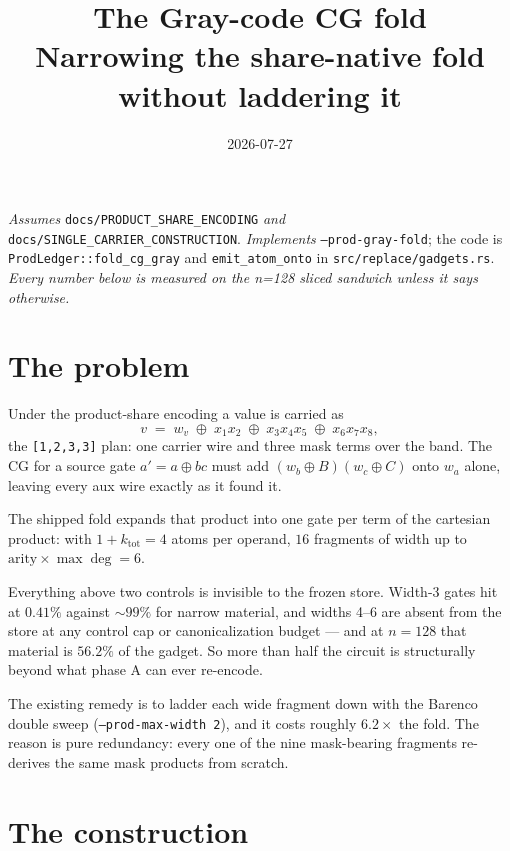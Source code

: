 \documentclass[11pt]{article}
\title{\textbf{The Gray-code CG fold}\\[2pt]
\large Narrowing the share-native fold without laddering it}
\author{}
\date{2026-07-27}
\newcommand{\xor}{\oplus}
\newcommand{\code}[1]{\texttt{#1}}
\begin{document}
\maketitle

\noindent\emph{Assumes} \code{docs/PRODUCT\_SHARE\_ENCODING} \emph{and}
\code{docs/SINGLE\_CARRIER\_CONSTRUCTION}. \emph{Implements}
\code{--prod-gray-fold}; the code is \code{ProdLedger::fold\_cg\_gray} and
\code{emit\_atom\_onto} in \code{src/replace/gadgets.rs}. \emph{Every number
below is measured on the n=128 sliced sandwich unless it says otherwise.}

\section{The problem}

Under the product-share encoding a value is carried as
\[
  v \;=\; w_v \;\xor\; x_1x_2 \;\xor\; x_3x_4x_5 \;\xor\; x_6x_7x_8 ,
\]
the \code{[1,2,3,3]} plan: one carrier wire and three mask terms over the band.
The CG for a source gate $a' = a \xor bc$ must add
$(w_b \xor B)(w_c \xor C)$ onto $w_a$ alone, leaving every aux wire exactly as
it found it.

The shipped fold expands that product into one gate per term of the cartesian
product: with $1 + k_{\mathrm{tot}} = 4$ atoms per operand, $16$ fragments of
width up to $\mathrm{arity} \times \max\deg = 6$.

Everything above two controls is invisible to the frozen store. Width-3 gates
hit at $0.41\%$ against $\sim\!99\%$ for narrow material, and widths 4--6 are
absent from the store at any control cap or canonicalization budget --- and at
$n=128$ that material is $56.2\%$ of the gadget. So more than half the circuit
is structurally beyond what phase A can ever re-encode.

The existing remedy is to ladder each wide fragment down with the Barenco
double sweep (\code{--prod-max-width 2}), and it costs roughly $6.2\times$ the
fold. The reason is pure redundancy: every one of the nine mask-bearing
fragments re-derives the same mask products from scratch.

\section{The construction}
\end{document}
